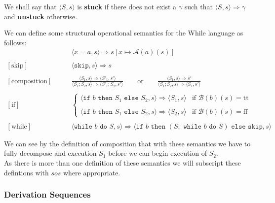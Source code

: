 \documentclass[a4paper, 12pt, twoside]{article}
\begin{document}
\noindent
We shall say that $\langle S, s \rangle$ is \textbf{stuck} if there
does not exist a $\gamma$ such that $\langle S, s \rangle
\Rightarrow \gamma$ and \textbf{unstuck} otherwise. 

\newpage

We can define some structural operational semantics for the While 
language as follows:
\begin{align*}
  [\text{assignment}]& \qquad \langle x=a, s \rangle \Rightarrow s[x\mapsto \mathcal{A}(a)(s)] \\ \\
  [\text{skip}]& \qquad \langle \texttt{skip}, s \rangle \Rightarrow s \\ \\
  [\text{composition}]& \qquad \frac{
    \langle S_1, s \rangle \Rightarrow \langle S'_1, s' \rangle
  }{\langle S_1;S_2, s \rangle \Rightarrow \langle S'_1;S_2, s' \rangle} 
  \qquad \text{or} \qquad \frac{
    \langle S_1, s \rangle \Rightarrow s'
  }{\langle S_1;S_2, s \rangle \Rightarrow \langle S_2, s' \rangle} \\ \\
  [\text{if}]& \qquad \begin{cases}
    \langle \texttt{if } b \texttt{ then } S_1 \texttt{ else } S_2, s \rangle \Rightarrow 
    \langle S_1, s \rangle
    & \text{if } \mathcal{B}(b)(s) = \text{tt} \\ \\
    \langle \texttt{if } b \texttt{ then } S_1 \texttt{ else } S_2, s \rangle \Rightarrow
    \langle S_2, s \rangle
    & \text{if } \mathcal{B}(b)(s) = \text{ff}
  \end{cases} \\ \\
  [\text{while}]& \qquad \langle \texttt{while } b \texttt{ do } S, s \rangle \Rightarrow
    \langle \texttt{if } b \texttt{ then } (S; \texttt{ while } b \texttt{ do } S)
    \texttt{ else skip}, s \rangle
\end{align*}

We can see by the definition of composition that with these 
semantics we have to fully decompose and execution $S_1$ before
we can begin execution of $S_2$.
\\[\baselineskip]
As there is more than one definition of these semantics
we will subscript these defintions with $sos$ where appropriate.

\subsubsection{Derivation Sequences}
\end{document}
